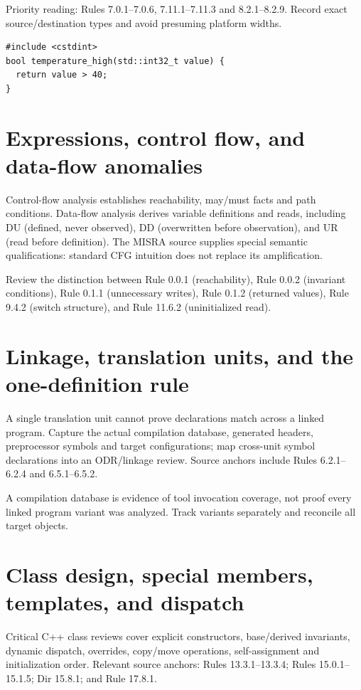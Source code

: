 \documentclass[10pt,letterpaper]{article}
\begin{document}
Priority reading: Rules 7.0.1--7.0.6, 7.11.1--7.11.3 and 8.2.1--8.2.9. Record exact source/destination types and avoid presuming platform widths.

\begin{lstlisting}[caption={Explicit predicate and type intent}]
#include <cstdint>
bool temperature_high(std::int32_t value) {
  return value > 40;
}
\end{lstlisting}

\section{Expressions, control flow, and data-flow anomalies}
Control-flow analysis establishes reachability, may/must facts and path conditions. Data-flow analysis derives variable definitions and reads, including DU (defined, never observed), DD (overwritten before observation), and UR (read before definition). The MISRA source supplies special semantic qualifications: standard CFG intuition does not replace its amplification.

Review the distinction between Rule 0.0.1 (reachability), Rule 0.0.2 (invariant conditions), Rule 0.1.1 (unnecessary writes), Rule 0.1.2 (returned values), Rule 9.4.2 (switch structure), and Rule 11.6.2 (uninitialized read).


\section{Linkage, translation units, and the one-definition rule}
A single translation unit cannot prove declarations match across a linked program. Capture the actual compilation database, generated headers, preprocessor symbols and target configurations; map cross-unit symbol declarations into an ODR/linkage review. Source anchors include Rules 6.2.1--6.2.4 and 6.5.1--6.5.2.

A compilation database is evidence of tool invocation coverage, not proof every linked program variant was analyzed. Track variants separately and reconcile all target objects.


\section{Class design, special members, templates, and dispatch}
Critical C++ class reviews cover explicit constructors, base/derived invariants, dynamic dispatch, overrides, copy/move operations, self-assignment and initialization order. Relevant source anchors: Rules 13.3.1--13.3.4; Rules 15.0.1--15.1.5; Dir 15.8.1; and Rule 17.8.1.
\end{document}
